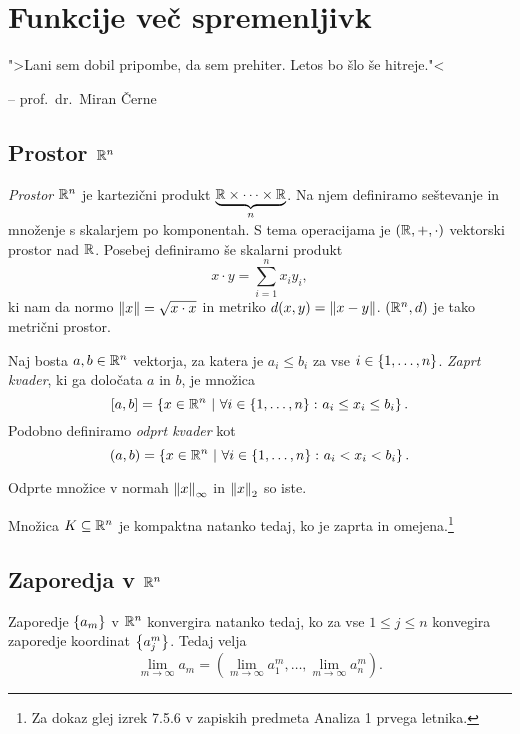 \section{Funkcije več spremenljivk}

\epigraph{">Lani sem dobil pripombe, da sem prehiter. Letos bo šlo še hitreje."<}{-- prof.~dr.~Miran Černe}

\subsection{Prostor $\mathbb{R}^n$}


\begin{definicija}
\emph{Prostor $\mathbb{R}^n$} je kartezični produkt
$\underbrace{\mathbb{R} \times \dots \times \mathbb{R}}_n$. Na njem definiramo
seštevanje in množenje s skalarjem po komponentah. S tema
operacijama je $(\mathbb{R},+,\cdot)$ vektorski prostor nad $\mathbb{R}$. Posebej
definiramo še skalarni produkt
\[
x \cdot y = \sum_{i=1}^n x_iy_i,
\]
ki nam da normo $\left\lVert x\right\rVert=\sqrt{x \cdot x}$ in metriko
$d(x,y) = \left\lVert x-y\right\rVert$. $(\mathbb{R}^n,d)$ je tako metrični prostor.
\end{definicija}

\begin{definicija}
Naj bosta $a,b \in \mathbb{R}^n$ vektorja, za katera je $a_i \leq b_i$ za
vse $i \in \left\{1,\dots,n\right\}$. \emph{Zaprt kvader}, ki
ga določata $a$ in $b$, je množica
\[
[a,b] = \left\{x\in\mathbb{R}^n~\middle\vert~\forall i \in \left\{1,\dots,n\right\} \colon
a_i \leq x_i \leq b_i\right\}.
\]
Podobno definiramo \emph{odprt kvader} kot
\[
(a,b) = \left\{x\in\mathbb{R}^n~\middle\vert~\forall i \in \left\{1,\dots,n\right\} \colon
a_i < x_i < b_i\right\}.
\]
\end{definicija}

\begin{opomba}
Odprte množice v normah $\left\lVert x\right\rVert_\infty$ in $\left\lVert x\right\rVert_2$ so iste.
\end{opomba}

\begin{izrek}
Množica $K\subseteq\mathbb{R}^n$ je kompaktna natanko tedaj, ko je zaprta
in omejena.\footnote{Za dokaz glej izrek 7.5.6 v zapiskih predmeta
Analiza 1 prvega letnika.}
\end{izrek}

\newpage

\subsection{Zaporedja v $\mathbb{R}^n$}

\begin{trditev}
Zaporedje $\left\{a_m\right\}$ v $\mathbb{R}^n$ konvergira natanko tedaj, ko za vse
$1 \leq j \leq n$ konvegira zaporedje koordinat $\left\{a_j^m\right\}$.
Tedaj velja
\[
\lim_{m\to\infty} a_m = \left(\lim_{m\to\infty} a_1^m, \dots,
\lim_{m\to\infty} a_n^m\right).
\]
\end{trditev}

